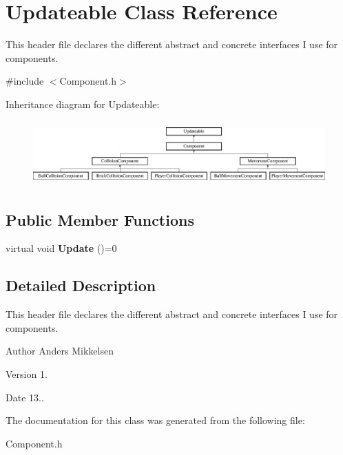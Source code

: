 \hypertarget{class_updateable}{}\section{Updateable Class Reference}
\label{class_updateable}


This header file declares the different abstract and concrete interfaces I use for components.  




{\ttfamily \#include $<$Component.\+h$>$}

Inheritance diagram for Updateable\+:\begin{figure}[H]
\begin{center}
\leavevmode
\includegraphics[height=2.516854cm]{class_updateable}
\end{center}
\end{figure}
\subsection*{Public Member Functions}
\begin{DoxyCompactItemize}
\item 
\hypertarget{class_updateable_a162a673ad3268dcfc9dd382e35122ebe}{}virtual void {\bfseries Update} ()=0\label{class_updateable_a162a673ad3268dcfc9dd382e35122ebe}

\end{DoxyCompactItemize}


\subsection{Detailed Description}
This header file declares the different abstract and concrete interfaces I use for components. 

\begin{DoxyAuthor}{Author}
Anders Mikkelsen 
\end{DoxyAuthor}
\begin{DoxyVersion}{Version}
1. 
\end{DoxyVersion}
\begin{DoxyDate}{Date}
13.. 
\end{DoxyDate}


The documentation for this class was generated from the following file\+:\begin{DoxyCompactItemize}
\item 
Component.\+h\end{DoxyCompactItemize}
